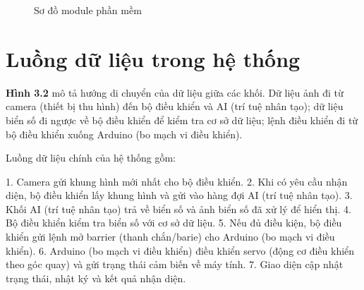 \documentclass[a4paper,14pt]{extreport}
\begin{document}
\begin{figure}[H]
\centering
{}
\caption{Sơ đồ module phần mềm}
\label{fig:module}
\end{figure}

\section{Luồng dữ liệu trong hệ thống}

\textbf{Hình 3.2} mô tả hướng di chuyển của dữ liệu giữa các khối. Dữ liệu ảnh đi từ camera (thiết bị thu hình) đến bộ điều khiển và AI (trí tuệ nhân tạo); dữ liệu biển số đi ngược về bộ điều khiển để kiểm tra cơ sở dữ liệu; lệnh điều khiển đi từ bộ điều khiển xuống Arduino (bo mạch vi điều khiển).

Luồng dữ liệu chính của hệ thống gồm:

1. Camera gửi khung hình mới nhất cho bộ điều khiển.
2. Khi có yêu cầu nhận diện, bộ điều khiển lấy khung hình và gửi vào hàng đợi AI (trí tuệ nhân tạo).
3. Khối AI (trí tuệ nhân tạo) trả về biển số và ảnh biển số đã xử lý để hiển thị.
4. Bộ điều khiển kiểm tra biển số với cơ sở dữ liệu.
5. Nếu đủ điều kiện, bộ điều khiển gửi lệnh mở barrier (thanh chắn/barie) cho Arduino (bo mạch vi điều khiển).
6. Arduino (bo mạch vi điều khiển) điều khiển servo (động cơ điều khiển theo góc quay) và gửi trạng thái cảm biến về máy tính.
7. Giao diện cập nhật trạng thái, nhật ký và kết quả nhận diện.
\end{document}

